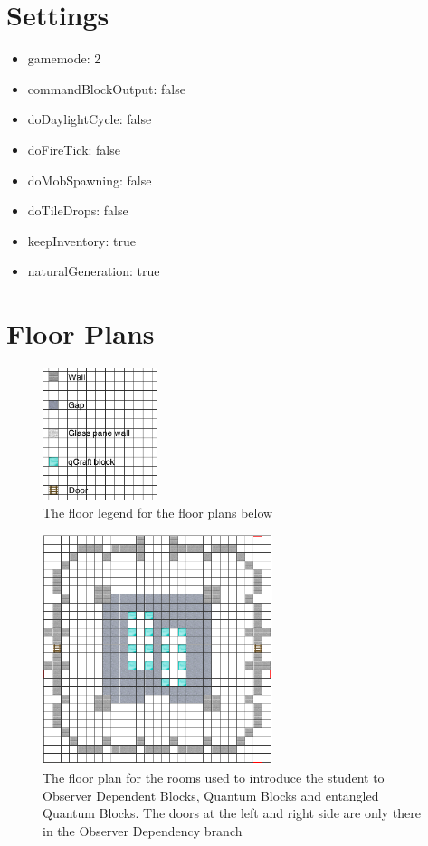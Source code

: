 \documentclass[11pt,twoside]{report} %
\begin{document}
\newpage

\chapter{Settings}
\label{app:settings}

\begin{itemize}
	\item gamemode: 2
	\item commandBlockOutput: false
	\item doDaylightCycle: false
	\item doFireTick: false
	\item doMobSpawning: false
	\item doTileDrops: false
	\item keepInventory: true
	\item naturalGeneration: true
\end{itemize}

\newpage

\chapter{Floor Plans}
\label{app:floorplans}

\begin{figure}[h!]
\centering
\includegraphics[width=0.3\textwidth]{legend}
\caption{The floor legend for the floor plans below}
\label{fig:legend}
\end{figure}

\begin{figure}[h!]
\centering
\includegraphics[width=0.6\textwidth]{qcraftblockrooms}
\caption{The floor plan for the rooms used to introduce the student to Observer Dependent Blocks, Quantum Blocks and entangled Quantum Blocks. The doors at the left and right side are only there in the Observer Dependency branch}
\label{fig:qcraftblockrooms}
\end{figure}
\end{document}
